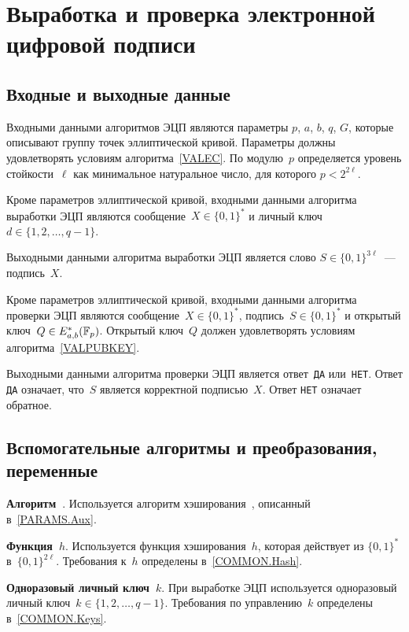 \section{Выработка и проверка электронной цифровой подписи}\label{SIGN}

\subsection{Входные и выходные данные}

Входными данными алгоритмов ЭЦП являются 
параметры $p$, $a$, $b$, $q$, $G$, которые описывают группу 
точек эллиптической кривой.
Параметры должны удовлетворять условиям алгоритма~\ref{VALEC}. 
По модулю~$p$ определяется уровень стойкости~$\ell$ как минимальное 
натуральное число, для которого $p<2^{2\ell}$.

Кроме параметров эллиптической кривой,
входными данными алгоритма выработки ЭЦП
являются сообщение~$X\in\{0,1\}^*$
и личный ключ~$d\in\{1,2,\ldots,q-1\}$.

Выходными данными алгоритма выработки ЭЦП
является слово $S\in\{0,1\}^{3\ell}$~--- 
подпись~$X$.

Кроме параметров эллиптической кривой,
входными данными алгоритма проверки ЭЦП 
являются сообщение~$X\in\{0,1\}^*$,
подпись~$S\in\{0,1\}^*$ и открытый ключ~$Q\in E_{a,b}^*(\mathbb{F}_p)$.
%
Открытый ключ~$Q$ должен удовлетворять условиям
алгоритма~\ref{VALPUBKEY}.

Выходными данными алгоритма проверки ЭЦП
является ответ~\texttt{ДА} или~\texttt{НЕТ}.
Ответ \texttt{ДА} означает, что~$S$ 
является корректной подписью~$X$.
Ответ \texttt{НЕТ} означает обратное.

\subsection{Вспомогательные алгоритмы и преобразования, переменные}
\label{SIGN.Aux}

{\bf Алгоритм~}.
Используется алгоритм хэширования~, 
описанный в~\ref{PARAMS.Aux}.

{\bf Функция~$h$}.
Используется функция хэширования~$h$, 
которая действует из $\{0,1\}^{*}$ в~$\{0,1\}^{2\ell}$.
Требования к~$h$ определены в~\ref{COMMON.Hash}.

{\bf Одноразовый личный ключ~$k$}.
При выработке ЭЦП используется одноразовый личный 
ключ~$k\in\{1,2,\ldots,q-1\}$.
Требования по управлению~$k$ определены в~\ref{COMMON.Keys}.

